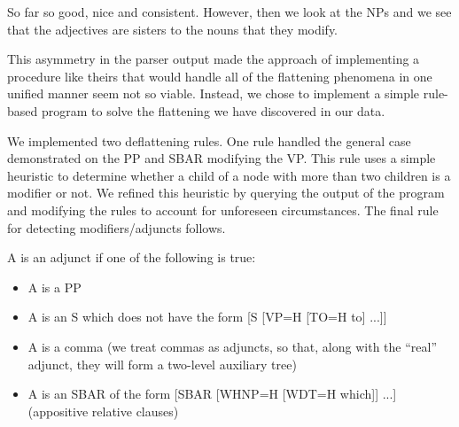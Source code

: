 \documentclass[a4paper]{article}
\begin{document}
So far so good, nice and consistent. However, then we look at the NPs
and we see that the adjectives are sisters to the nouns that they
modify.


This asymmetry in the parser output made the approach of implementing
a procedure like theirs that would handle all of the flattening
phenomena in one unified manner seem not so viable. Instead, we chose
to implement a simple rule-based program to solve the flattening we
have discovered in our data.

We implemented two deflattening rules. One rule handled the general
case demonstrated on the PP and SBAR modifying the VP. This rule uses
a simple heuristic to determine whether a child of a node with more
than two children is a modifier or not. We refined this heuristic by
querying the output of the program and modifying the rules to account
for unforeseen circumstances. The final rule for detecting
modifiers/adjuncts follows.

A is an adjunct if one of the following is true:

\begin{itemize}
\item A is a PP
\item A is an S which does not have the form [S [VP=H [TO=H to] ...]]
\item A is a comma (we treat commas as adjuncts, so that, along with
  the ``real'' adjunct, they will form a two-level auxiliary tree)
\item A is an SBAR of the form [SBAR [WHNP=H [WDT=H which]] ...]
  (appositive relative clauses)
\end{itemize}
\end{document}
